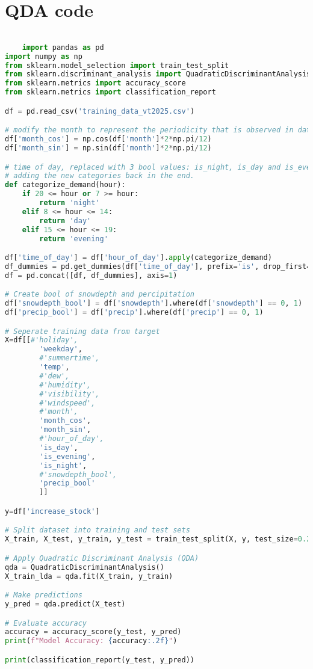 \section*{QDA code}
\begin{lstlisting}[language = Python]

    import pandas as pd
import numpy as np
from sklearn.model_selection import train_test_split
from sklearn.discriminant_analysis import QuadraticDiscriminantAnalysis
from sklearn.metrics import accuracy_score
from sklearn.metrics import classification_report

df = pd.read_csv('training_data_vt2025.csv')

# modify the month to represent the periodicity that is observed in data.
df['month_cos'] = np.cos(df['month']*2*np.pi/12)
df['month_sin'] = np.sin(df['month']*2*np.pi/12)

# time of day, replaced with 3 bool values: is_night, is_day and is_evening, 
# adding the new categories back in the end.
def categorize_demand(hour):
    if 20 <= hour or 7 >= hour:
        return 'night'
    elif 8 <= hour <= 14:
        return 'day'
    elif 15 <= hour <= 19:
        return 'evening'

df['time_of_day'] = df['hour_of_day'].apply(categorize_demand)
df_dummies = pd.get_dummies(df['time_of_day'], prefix='is', drop_first=False)
df = pd.concat([df, df_dummies], axis=1)

# Create bool of snowdepth and percipitation
df['snowdepth_bool'] = df['snowdepth'].where(df['snowdepth'] == 0, 1)
df['precip_bool'] = df['precip'].where(df['precip'] == 0, 1)

# Seperate training data from target
X=df[[#'holiday',
        'weekday',
        #'summertime',
        'temp',
        #'dew',
        #'humidity',
        #'visibility',
        #'windspeed',
        #'month',
        'month_cos',
        'month_sin',
        #'hour_of_day',
        'is_day',
        'is_evening',
        'is_night',
        #'snowdepth_bool',
        'precip_bool'
        ]]

y=df['increase_stock']

# Split dataset into training and test sets
X_train, X_test, y_train, y_test = train_test_split(X, y, test_size=0.2, random_state=42)

# Apply Quadratic Discriminant Analysis (QDA)
qda = QuadraticDiscriminantAnalysis() 
X_train_lda = qda.fit(X_train, y_train)

# Make predictions
y_pred = qda.predict(X_test)

# Evaluate accuracy
accuracy = accuracy_score(y_test, y_pred)
print(f"Model Accuracy: {accuracy:.2f}")

print(classification_report(y_test, y_pred))
\end{lstlisting}


